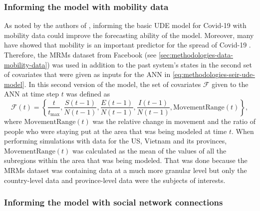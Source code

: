 \subsubsection{Informing the model with mobility data}

As noted by the authors of \cite{dandekarMachineLearningAidedGlobal2020a}, informing the basic \gls{UDE} model for Covid-19 with mobility data could improve the forecasting ability of the model.
Moreover, many have showed that mobility is an important predictor for the spread of Covid-19 \cite{changMobilityNetworkModels2021,ihmecovid-19forecastingteamModelingCOVID19Scenarios2021,liSubstantialUndocumentedInfection2020}.
Therefore, the \glspl{MRM} dataset from Facebook (see \autoref{sec:methodologies-data-mobility-data}) was used in addition to the past system's states in the second set of covariates that were given as inputs for the \gls{ANN} in \autoref{eq:methodologies-seir-ude-model}.
In this second version of the model, the set of covariates $\mathcal{F}$ given to the \gls{ANN} at time step $t$ was defined as
\begin{equation}
    \mathcal{F}(t) = \left\lbrace \frac{t}{t_\text{max}}, \frac{S(t-1)}{N(t-1)}, \frac{E(t-1)}{N(t-1)}, \frac{I(t-1)}{N(t-1)}, \text{MovementRange}(t) \right\rbrace,
\end{equation}
where $\text{MovementRange}(t)$ was the relative change in movement and the ratio of people who were staying put at the area that was being modeled at time $t$.
When performing simulations with data for the \gls{US}, Vietnam and its provinces, $\text{MovementRange}(t)$ was calculated as the mean of the values of all the subregions within the area that was being modeled.
That was done because the \glspl{MRM} dataset was containing data at a much more granular level but only the country-level data and province-level data were the subjects of interests.

\subsubsection{Informing the model with social network connections}

